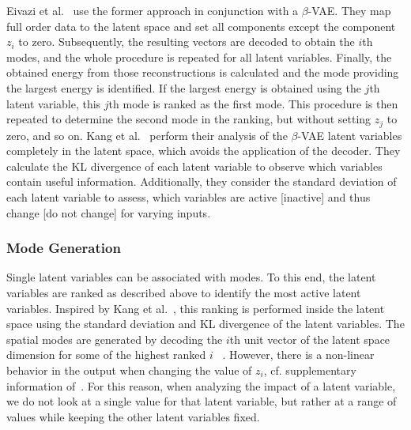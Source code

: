 Eivazi et al.~\cite{eivazi:2022} use the former approach in conjunction with a $\beta$-VAE. They map full order data to the latent space and set all components except the component $z_i$ to zero. Subsequently, the resulting vectors are decoded to obtain the $i$th modes, and the whole procedure is repeated for all latent variables. Finally, the obtained energy from those reconstructions is calculated and the mode providing the largest energy is identified. If the largest energy is obtained using the $j$th latent variable, this $j$th mode is ranked as the first mode. This procedure is then repeated to determine the second mode in the ranking, but without setting $z_j$ to zero, and so on.
%
 Kang et al.~\cite{kang:2022} perform their analysis of the $\beta$-VAE latent variables completely in the latent space, which avoids the application of the decoder. They calculate the KL divergence of each latent variable to observe which variables contain useful information. Additionally, they consider the standard deviation of each latent variable to assess, which variables are active [inactive] and thus change [do not change] for varying inputs.  

\subsubsection{Mode Generation}
Single latent variables can be associated with modes. To this end, the latent variables are ranked as described above to identify the most active latent variables. {Inspired by Kang et al.~\cite{kang:2022}, this ranking is performed inside the latent space using the standard deviation and KL divergence of the latent variables.} 
The spatial modes are generated by decoding the $i$th unit vector of the latent space dimension for some of the highest ranked $i$ ~\cite{eivazi:2020, solera-rico:2024}. 
However, there is a non-linear behavior in the output when changing the value of $z_i$, cf. supplementary information of~\cite{solera-rico:2024}. 
%
 For this reason, when analyzing the impact of a latent variable, we do not look at a single value for that latent variable, but rather at a range of values while keeping the other latent variables fixed.